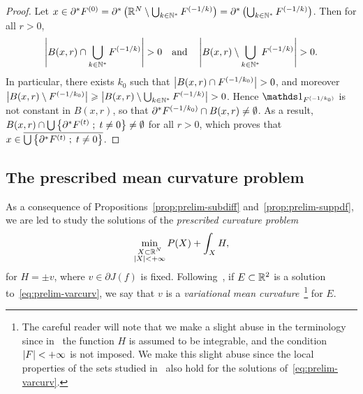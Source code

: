 \begin{proof}
Let $x\in \partial^*F^{(0)} = \partial^*\left(\mathbb{R}^N\setminus \bigcup_{k\in\mathbb{N}^*}F^{(-1/k)} \right) =  \partial^*\left(\bigcup_{k\in\mathbb{N}^*}F^{(-1/k)} \right)$.
Then for all $r>0$, 
\begin{equation*}
  \abs{B(x,r)\cap \bigcup_{k\in\NN^*}\F{-1/k}}>0 \qandq  \abs{B(x,r)\setminus \bigcup_{k\in\NN^*}\F{-1/k}}>0.
\end{equation*}
In particular, there exists $k_0$ such that $\abs{B(x,r)\cap \F{-1/k_0}}>0$, and moreover $\abs{B(x,r)\setminus \F{-1/k_0}}\geq  \abs{B(x,r)\setminus \bigcup_{k\in\NN^*}\F{-1/k}}>0$.
Hence $\bun{\F{-1/k_0}}$ is not constant in $B(x,r)$, so that $\partial^* F^{(-1/k_0)}\cap B(x,r)\neq \emptyset$.
As a result, $B(x,r)\cap \bigcup\left\{ \partial^*F^{(t)} \;;\; t\neq 0 \right\}\neq \emptyset$ for all $r>0$, which proves that $x\in \overline{\bigcup\left\{ \partial^*F^{(t)} \;;\; t\neq 0 \right\}}$.

\end{proof}




\subsection{The prescribed mean curvature problem}\label{sec:PMC_prob}
As a consequence of Propositions~\ref{prop:prelim-subdiff} and~\ref{prop:prelim-suppdf}, we are led to study the solutions of the \textit{prescribed curvature problem}
\begin{equation}\label{eq:prelim-varcurv}
  \min_{\substack{X\subset \mathbb{R}^N\\\left| X \right|<+\infty}} P(X) + \int_X H,
\end{equation}
for $H=\pm v$, where $v\in \partial J(f)$ is fixed.
Following~\cite{Barozzi}, if $E\subset \mathbb{R}^2$ is a solution to~\eqref{eq:prelim-varcurv}, we say that $v$ is a \textit{variational mean curvature}~\footnote{The careful reader will note that we make a slight abuse in the terminology since in~\cite{Barozzi, massari1994variational} the function $H$ is assumed to be integrable, and the condition $\left| F \right|<+\infty$ is not imposed. We make this slight abuse since the local properties of the sets studied in~\cite{Barozzi, massari1994variational} also hold for the solutions of~\eqref{eq:prelim-varcurv}.} for $E$.

